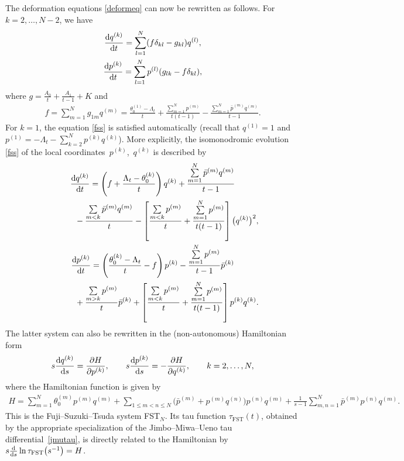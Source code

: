 \documentclass[pdftex]{sigma}
\numberwithin{equation}{section}
\begin{document}
The deformation equations \eqref{deformeq} can now be rewritten as follows. For $k=2,\ldots, N-2$, we have
\begin{gather}
\frac{{\rm d}q^{(k)} }{{\rm d}t}= \sum_{l=1}^N(f\delta_{kl}-g_{kl}) q^{(l)} ,\nonumber\\
\frac{{\rm d}p^{(k)} }{{\rm d}t}= \sum_{l=1}^N p^{(l)}(g_{lk}-f\delta_{kl}) ,\label{fss}
\end{gather}
where $g=\frac{A_0}{t}+\frac{A_1}{t-1}+K$ and
\begin{gather*}
f=\sum_{m=1}^N g_{1m}q^{(m)}=\frac{\theta_0^{(1)}-\Lambda_t}{t}+\frac{\sum\limits_{m=1}^N p^{(m)}}{t(t-1)}-\frac{\sum\limits_{m=1}^N\bar p^{(m)}q^{(m)}}{t-1}.
\end{gather*}
For $k=1$, the equation \eqref{fss} is satisfied automatically (recall that $q^{(1)}=1$ and $p^{(1)}=-\Lambda_t-\sum\limits_{k=2}^Np^{(k)}q^{(k)}$).
More explicitly, the isomonodromic evolution \eqref{fss} of the local coordina\-tes~$p^{(k)}$,~$q^{(k)}$ is described by
\begin{gather*}
\frac{{\rm d}q^{(k)} }{{\rm d}t}= \left( f +\frac{\Lambda_t -\theta_0^{(k)}}{t}\right) q^{(k)}+\frac{\sum\limits_{m=1}^N\bar p^{(m)}q^{(m)}}{t-1}\\
\hphantom{\frac{{\rm d}q^{(k)} }{{\rm d}t}=}{} -\frac{\sum\limits_{m<k}\bar p^{(m)}q^{(m)}}{t}-\left[\frac{\sum\limits_{m< k}p^{(m)}}t+\frac{\sum\limits_{m=1}^N p^{(m)}}{t(t-1)}\right]\big(q^{(k)}\big)^2, \\
\frac{{\rm d}p^{(k)} }{{\rm d}t}=\left(\frac{\theta_0^{(k)}-\Lambda_t }{t}-f \right) p^{(k)}-\frac{\sum\limits_{m=1}^Np^{(m)}}{t-1} \bar p^{(k)}\\
\hphantom{\frac{{\rm d}p^{(k)} }{{\rm d}t}=}{} +\frac{\sum\limits_{m>k}p^{(m)}}{t} \bar p^{(k)}
+\left[\frac{\sum\limits_{m< k}p^{(m)}}t+\frac{\sum\limits_{m=1}^N p^{(m)}}{t(t-1)}\right]p^{(k)}q^{(k)}.
\end{gather*}
The latter system can also be rewritten in the (non-autonomous) Hamiltonian form
\begin{gather*}
s\frac{{\rm d}q^{(k)} }{{\rm d}s}= \frac{\partial H}{\partial p^{(k)} } ,\qquad s\frac{{\rm d}p^{(k)} }{{\rm d}s}=- \frac{\partial H}{\partial q^{(k)} } , \qquad k=2,\ldots,N,
\end{gather*}
where the Hamiltonian function is given by
\begin{gather*}%
H=\sum_{m=1}^N \theta_0^{(m)}p^{(m)}q^{(m)}+\sum_{1\le m<n\le N} \big(\bar p^{(m)}+p^{(m)}q^{(n)}\big) p^{(n)}q^{(m)}+\frac{1}{s-1}\sum_{m,n=1}^N\bar p^{(m)}p^{(n)}q^{(m)}.
\end{gather*}
This is the Fuji--Suzuki--Tsuda system FST$_N$. Its tau function $\tau_{\mathrm{FST}}(t)$, obtained by the appropriate specialization of the Jimbo--Miwa--Ueno tau differential~\eqref{jmutau}, is directly related to the Hamiltonian by $s\frac{{\rm d}}{{\rm d}s}\ln\tau_{\mathrm{FST}}\big(s^{-1}\big)=H$.
\end{document}

